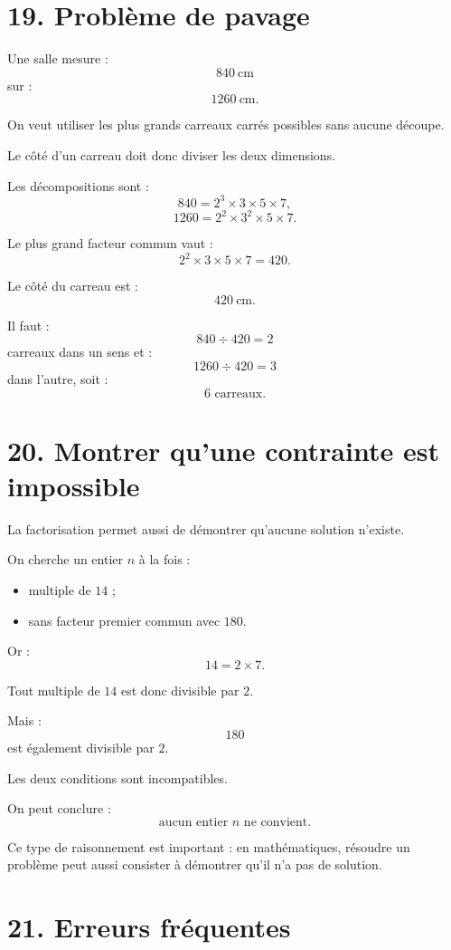 \section{19. Problème de pavage}

Une salle mesure :
\[
840\ \text{cm}
\]
sur :
\[
1260\ \text{cm}.
\]

On veut utiliser les plus grands carreaux carrés possibles sans aucune découpe.

Le côté d'un carreau doit donc diviser les deux dimensions.

Les décompositions sont :
\[
840=2^3\times3\times5\times7,
\]
\[
1260=2^2\times3^2\times5\times7.
\]

Le plus grand facteur commun vaut :
\[
2^2\times3\times5\times7=420.
\]

Le côté du carreau est :
\[
420\ \text{cm}.
\]

Il faut :
\[
840\div420=2
\]
carreaux dans un sens et :
\[
1260\div420=3
\]
dans l'autre, soit :
\[
\boxed{6\text{ carreaux}}.
\]

\section{20. Montrer qu'une contrainte est impossible}

La factorisation permet aussi de démontrer qu'aucune solution n'existe.

On cherche un entier $n$ à la fois :
\begin{itemize}
\item multiple de $14$ ;
\item sans facteur premier commun avec $180$.
\end{itemize}

Or :
\[
14=2\times7.
\]

Tout multiple de $14$ est donc divisible par $2$.

Mais :
\[
180
\]
est également divisible par $2$.

Les deux conditions sont incompatibles.

On peut conclure :
\[
\boxed{\text{aucun entier }n\text{ ne convient}}.
\]

Ce type de raisonnement est important : en mathématiques, résoudre un problème peut aussi consister à démontrer qu'il n'a pas de solution.

\section{21. Erreurs fréquentes}

